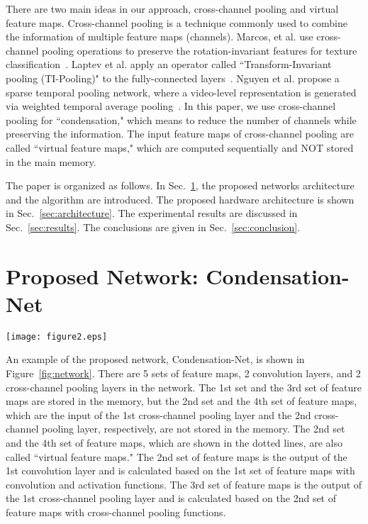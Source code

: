 \documentclass[10pt,twocolumn,letterpaper]{article}
\begin{document}
There are two main ideas in our approach, cross-channel pooling and virtual feature maps. Cross-channel pooling is a technique commonly used to combine the information of multiple feature maps (channels). Marcos, et al. use cross-channel pooling operations to preserve the rotation-invariant features for texture classification~\cite{Marcos16}. Laptev et al. apply an operator called ``Transform-Invariant pooling (TI-Pooling)" to the fully-connected layers~\cite{Laptev16}. Nguyen et al. propose a sparse temporal pooling network, where a video-level representation is generated via weighted temporal average pooling~\cite{Nguyen17}. In this paper, we use cross-channel pooling for ``condensation," which means to reduce the number of channels while preserving the information. The input feature maps of cross-channel pooling are called ``virtual feature maps," which are computed sequentially and NOT stored in the main memory. 

The paper is organized as follows. In Sec.~\ref{sec:algorithm}, the proposed networks architecture and the algorithm are introduced. The proposed hardware architecture is shown in Sec.~\ref{sec:architecture}. The experimental results are discussed in Sec.~\ref{sec:results}. The conclusions are given in Sec.~\ref{sec:conclusion}.

\section{Proposed Network: Condensation-Net}
\label{sec:algorithm}

\begin{figure*}[h]
\begin{center}
\texttt{[image: figure2.eps]}
\end{center}
   \caption{Example of the proposed network, Condensation-Net.}
\label{fig:network}
\end{figure*}

An example of the proposed network, Condensation-Net, is shown in Figure~\ref{fig:network}. There are 5 sets of feature maps, 2 convolution layers, and 2 cross-channel pooling layers in the network. The 1st set and the 3rd set of feature maps are stored in the memory, but the 2nd set and the 4th set of feature maps, which are the input of the 1st cross-channel pooling layer and the 2nd cross-channel pooling layer, respectively, are not stored in the memory. The 2nd set and the 4th set of feature maps, which are shown in the dotted lines, are also called ``virtual feature maps." The 2nd set of feature maps is the output of the 1st convolution layer and is calculated based on the 1st set of feature maps with convolution and activation functions. The 3rd set of feature maps is the output of the 1st cross-channel pooling layer and is calculated based on the 2nd set of feature maps with cross-channel pooling functions.
\end{document}
